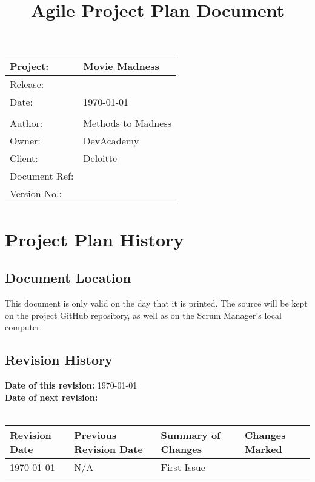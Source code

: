 \documentclass[a4paper,12pt]{article}
\title{\textbf{Agile Project Plan Document}}
\author{}
\date{}
\begin{document}
\thispagestyle{empty}
\renewcommand{\arraystretch}{2}

\maketitle

\begin{tabularx}{\textwidth}{|l|X|}
	\hline
		\textbf{{\huge Project:}} &
		\textbf{{\huge Movie Madness}}\\
	\hline
		Release: &
		\\
	\hline
		Date: &
		\today \\
	\hline
		&
		\\
	\hline
		{\Large Author:} &
		{\Large Methods to Madness}\\
	\hline
		Owner: &
		DevAcademy\\
	\hline
		Client: &
		Deloitte\\
	\hline
		Document Ref: &
		\\
	\hline
		Version No.: &
		\\
	\hline
	
\end{tabularx}

\newpage

\section{Project Plan History}

\subsection{Document Location}

This document is only valid on the day that it is printed. The source will be kept on the project GitHub repository, as well as on the Scrum Manager's local computer. 

\subsection{Revision History}

\textbf{Date of this revision: } \today \\
\textbf{Date of next revision: } \\
\noindent \\
\begin{tabularx}{\textwidth}{|X|X|X|X|}
	
	\hline
	\textbf{Revision Date} & 
	\textbf{Previous Revision Date} & 
	\textbf{Summary of Changes} & 
	\textbf{Changes Marked} \\
	\hline	
	\today &
	N/A & 
	First Issue & 
		\\
	\hline
	
\end{tabularx}
\end{document}
